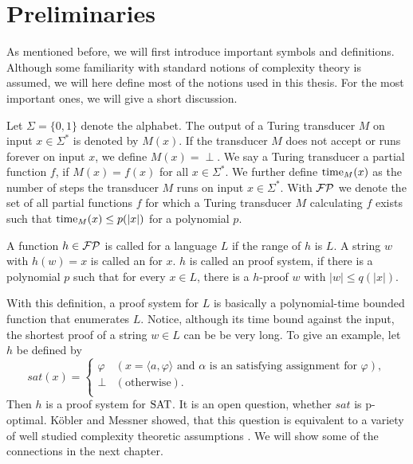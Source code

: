 \chapter{Preliminaries}
  As mentioned before, we will first introduce important symbols and definitions. Although some familiarity with standard notions of complexity theory is assumed, we will here define most of the notions used in this thesis. For the most important ones, we will give a short discussion.

  Let \(\Sigma = \{ 0, 1 \}\) denote the alphabet. The output of a Turing transducer \(M\) on input \(x \in \Sigma^*\) is denoted by \(M(x)\). If the transducer \(M\) does not accept or runs forever on input \(x\), we define \(M(x) = \perp\). We say a Turing transducer  a partial function \(f\), if \(M(x) = f(x)\) for all \(x \in \Sigma^*\). We further define \(\operatorname{time}_M(x)\) as the number of steps the transducer \(M\) runs on input \(x \in \Sigma^*\). With \(\mathcal{FP}\) we denote the set of all partial functions \(f\) for which a Turing transducer \(M\) calculating \(f\) exists such that \(\operatorname{time}_M(x) \leq p(|x|)\) for a polynomial \(p\).

  \begin{definition}
    A function \(h \in \mathcal{FP}\) is called  for a language \(L\) if the range of \(h\) is \(L\). A string \(w\) with \(h(w) = x\) is called an  for \(x\). \(h\) is called an  proof system, if there is a polynomial \(p\) such that for every \(x \in L\), there is a \(h\)-proof \(w\) with \(|w| \leq q(|x|)\).
  \end{definition}

  With this definition, a proof system for \(L\) is basically a polynomial-time bounded function that enumerates \(L\). Notice, although its time bound against the input, the shortest proof of a string \(w \in L\) can be be very long. To give an example, let \(h\) be defined by
    \[
       sat(x) =
       \begin{cases}
         \varphi & (x = \langle a, \varphi \rangle \text{ and \(\alpha\) is an satisfying assignment for \(\varphi\)}), \\
         \perp & (\text{otherwise}). \\
       \end{cases}
    \]
  Then \(h\) is a proof system for \(\text{SAT}\). It is an open question, whether \(sat\) is p-optimal. Köbler and Messner showed, that this question is equivalent to a variety of well studied complexity theoretic assumptions \cite{KM00}. We will show some of the connections in the next chapter.

